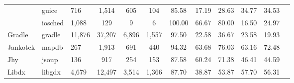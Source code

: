 \begin{table}
{\begin{tabular}{lllccccccccc}
                            & guice                                                         & 716             & 1,514            & 605                                                              & 104            & 85.58          & 17.19          & 28.63          & 34.77                                                             & 34.53                                                              \\
                            & iosched                                                       & 1,088           & 129              & 9                                                                & 6              & 100.00         & 66.67          & 80.00          & 16.50                                                             & 24.97                                                              \\ \hline
Gradle                      & gradle                                                        & 11,876          & 37,207           & 6,896                                                            & 1,557          & 97.50          & 22.58          & 36.67          & 23.58                                                             & 19.93                                                              \\ \hline
Jankotek                    & mapdb                                                         & 267             & 1,913            & 691                                                              & 440            & 94.32          & 63.68          & 76.03          & 63.16                                                             & 72.48                                                              \\ \hline
Jhy                         & jsoup                                                         & 136             & 917              & 254                                                              & 153            & 87.58          & 60.24          & 71.38          & 46.41                                                             & 44.59                                                              \\ \hline
Libdx                       & libgdx                                                        & 4,679           & 12,497           & 3,514                                                            & 1,366          & 87.70          & 38.87          & 53.87          & 57.70                                                             & 56.31                                                              \\ \hline

\end{tabular}}
\end{table}
